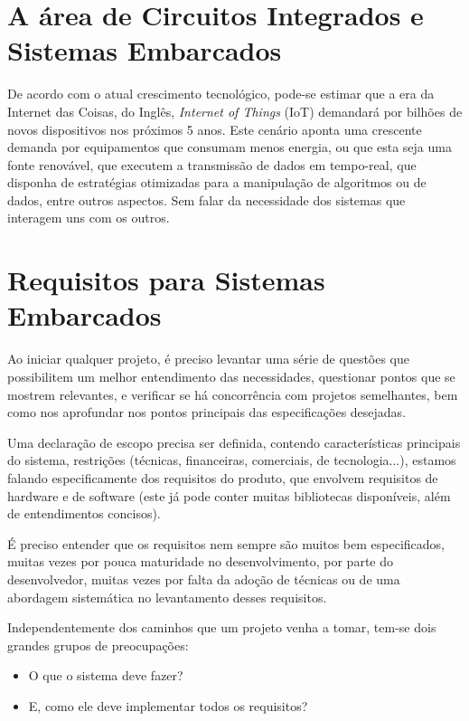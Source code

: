 \documentclass[
	12pt,				%
	openright,			%
  oneside,     %
	a4paper,			%
	english,			%
	french,				%
	spanish,			%
	brazil				%
	]{abntex2}
\begin{document}
\section*{A área de Circuitos Integrados e Sistemas Embarcados}

De acordo com o atual crescimento tecnológico, pode-se estimar que a era da Internet das Coisas, do Inglês, \textit{Internet of Things} (IoT) demandará por bilhões de novos dispositivos nos próximos 5 anos. Este cenário aponta uma crescente demanda por equipamentos que consumam menos energia, ou que esta seja uma fonte renovável, que executem a transmissão de dados em tempo-real, que disponha de estratégias otimizadas para a manipulação de algoritmos ou de dados, entre outros aspectos. Sem falar da necessidade dos sistemas que interagem uns com os outros.


\section*{Requisitos para Sistemas Embarcados} %
\label{sec:requisitos}

Ao iniciar qualquer projeto, é preciso levantar uma série de questões que possibilitem um melhor entendimento das necessidades, questionar pontos que se mostrem relevantes, e verificar se há concorrência com projetos semelhantes, bem como nos aprofundar nos pontos principais das especificações desejadas.

Uma declaração de escopo precisa ser definida, contendo características principais do sistema, restrições (técnicas, financeiras, comerciais, de tecnologia...), estamos falando especificamente dos requisitos do produto, que envolvem requisitos de hardware e de software (este já pode conter muitas bibliotecas disponíveis, além de entendimentos concisos).

É preciso entender que os requisitos nem sempre são muitos bem especificados, muitas vezes por pouca maturidade no desenvolvimento, por parte do desenvolvedor, muitas vezes por falta da adoção de técnicas ou de uma abordagem sistemática no levantamento desses requisitos.

Independentemente dos caminhos que um projeto venha a tomar, tem-se dois grandes grupos de preocupações:

\begin{itemize}
    \item O que o sistema deve fazer?
    \item E, como ele deve implementar todos os requisitos?
\end{itemize}
\end{document}
